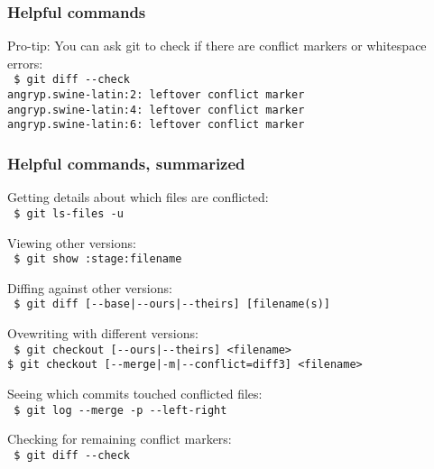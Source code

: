 \documentclass[t]{beamer}
\begin{document}

\begin{frame}
  \frametitle{Helpful commands}

  Pro-tip: You can ask git to check if there are conflict markers or
  whitespace errors:\\[0.25\baselineskip]
    {\scriptsize\texttt{%
    \$ git diff -{}-check\\
    angryp.swine-latin:2: leftover conflict marker\\
    angryp.swine-latin:4: leftover conflict marker\\
    angryp.swine-latin:6: leftover conflict marker\\
    }}

\end{frame}


\begin{frame}
  \frametitle{Helpful commands, summarized}

  Getting details about which files are conflicted:\\
    {\footnotesize\texttt{%
    \$ git ls-files -u \\[\baselineskip]
    }}

  Viewing other versions:\\
    {\footnotesize\texttt{%
    \$ git show :stage:filename \\[\baselineskip]
    }}

  Diffing against other versions:\\
    {\footnotesize\texttt{%
    \$ git diff [-{}-base|-{}-ours|-{}-theirs] [filename(s)] \\[\baselineskip]
    }}

  Ovewriting with different versions:\\
    {\footnotesize\texttt{%
    \$ git checkout [-{}-ours|-{}-theirs] <filename> \\
    \$ git checkout [-{}-merge|-m|-{}-conflict=diff3] <filename>
          \\[\baselineskip]
    }}

  Seeing which commits touched conflicted files:\\
    {\scriptsize\texttt{%
    \$ git log -{}-merge -p -{}-left-right\\[\baselineskip]
    }}

  Checking for remaining conflict markers:\\
    {\scriptsize\texttt{%
    \$ git diff -{}-check\\[\baselineskip]
    }}

\end{frame}
\end{document}
